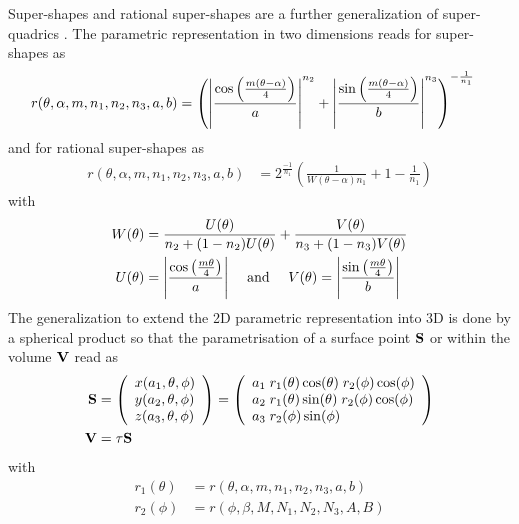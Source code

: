 Super-shapes \cite{Gielis2003,Arslan2009,Fougerolle2007} and rational super-shapes \cite{Blanc1996,Fougerolle2007} are a further generalization of super-quadrics \cite{Barr1981}.
The parametric representation in two dimensions reads for super-shapes as \cite{Gielis2003}
\begin{align} \label{eq:supershapes:parametric_r}
r(\theta,\alpha,m,n_1,n_2,n_3,a,b) &= \left({\left\vert\frac{\cos\left(\frac{m\left(\theta-\alpha\right)}{4}\right)}{a}\right\vert}^{n_2}+{\left\vert\frac{\sin\left(\frac{m\left(\theta-\alpha\right)}{4}\right)}{b}\right\vert}^{n_3}\right)^{-\frac{1}{n_1}}
\end{align}
and for rational super-shapes \cite{Blanc1996,Fougerolle2007} as
\begin{align}\label{eq:rationalsupershapes:parametric_r}
  r(\theta,\alpha,m,n_1,n_2,n_3,a,b) &= 2^{\frac{-1}{n_1}} \left(\frac{1}{W(\theta-\alpha)n_1}+1-\frac{1}{n_1}\right)
\end{align}
with
\begin{align}
  W(\theta) &= \frac{U(\theta)}{n_2+(1-n_2)U(\theta)} + \frac{V(\theta)}{n_3+(1-n_3)V(\theta)} \\
  U(\theta)&= {\left\vert\frac{\cos\left(\frac{m\theta}{4}\right)}{a}\right\vert} \quad \mbox{~and~}\quad  V(\theta)= {\left\vert\frac{\sin\left(\frac{m\theta}{4}\right)}{b}\right\vert}
\end{align}
The generalization to extend the 2D parametric representation into 3D is done by a spherical product so that the parametrisation of a surface point ${\bf S}$ or within the volume ${\bf V}$ read as
\begin{align}\label{eq:supershapes:parametric}
{\bf S} &=\left(
    \begin{array}{l}
      x(a_1,\theta,\phi) \\
      y(a_2,\theta,\phi) \\
      z(a_3,\theta,\phi) \\
    \end{array}
  \right)
 =
 \left(
    \begin{array}{l}
     a_1 \; r_1(\theta) \cos(\theta) \; r_2(\phi) \cos(\phi)  \\
     a_2 \; r_1(\theta) \sin(\theta) \; r_2(\phi) \cos(\phi)  \\
     a_3 \; r_2(\phi)   \sin(\phi) \\
    \end{array}
  \right) \\
 {\bf V} &= \tau  {\bf S}
\end{align}
with
\begin{align} \label{eq:supershapes:parametric_r1}
r_1(\theta) &= r(\theta,\alpha,m,n_1,n_2,n_3,a,b) \\
\label{eq:supershapes:parametric_r2}
r_2(\phi)   &= r(\phi,  \beta, M,N_1,N_2,N_3,A,B)
\end{align}
